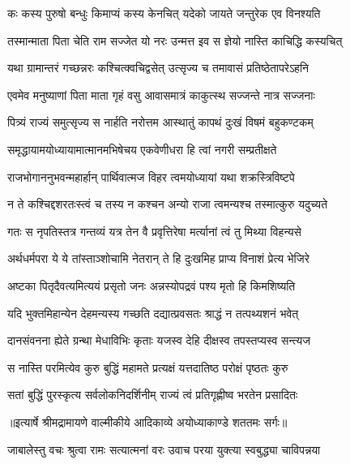 \twolineshloka
{कः कस्य पुरुषो बन्धुः किमाप्यं कस्य केनचित्}
{यदेको जायते जन्तुरेक एव विनश्यति} %

\twolineshloka
{तस्मान्माता पिता चेति राम सज्जेत यो नरः}
{उन्मत्त इव स ज्ञेयो नास्ति काचिद्धि कस्यचित्} %

\twolineshloka
{यथा ग्रामान्तरं गच्छन्नरः कश्चित्क्वचिद्वसेत्}
{उत्सृज्य च तमावासं प्रतिष्ठेतापरेऽहनि} %

\twolineshloka
{एवमेव मनुष्याणां पिता माता गृहं वसु}
{आवासमात्रं काकुत्स्थ सज्जन्ते नात्र सज्जनाः} %

\twolineshloka
{पित्र्यं राज्यं समुत्सृज्य स नार्हति नरोत्तम}
{आस्थातुं कापथं दुःखं विषमं बहुकण्टकम्} %

\twolineshloka
{समृद्धायामयोध्यायामात्मानमभिषेचय}
{एकवेणीधरा हि त्वां नगरी सम्प्रतीक्षते} %

\twolineshloka
{राजभोगाननुभवन्महार्हान् पार्थिवात्मज}
{विहर त्वमयोध्यायां यथा शक्रस्त्रिविष्टपे} %

\twolineshloka
{न ते कश्चिद्दशरतःस्त्वं च तस्य न कश्चन}
{अन्यो राजा त्वमन्यश्च तस्मात्कुरु यदुच्यते} %

\twolineshloka
{गतः स नृपतिस्तत्र गन्तव्यं यत्र तेन वै}
{प्रवृत्तिरेषा मर्त्यानां त्वं तु मिथ्या विहन्यसे} %

\twolineshloka
{अर्थधर्मपरा ये ये तांस्ताञ्शोचामि नेतरान्}
{ते हि दुःखमिह प्राप्य विनाशं प्रेत्य भेजिरे} %

\twolineshloka
{अष्टका पितृदैवत्यमित्ययं प्रसृतो जनः}
{अन्नस्योपद्रवं पश्य मृतो हि किमशिष्यति} %

\twolineshloka
{यदि भुक्तमिहान्येन देहमन्यस्य गच्छति}
{दद्यात्प्रवसतः श्राद्धं न तत्पथ्यशनं भवेत्} %

\twolineshloka
{दानसंवनना ह्येते ग्रन्था मेधाविभिः कृताः}
{यजस्व देहि दीक्षस्व तपस्तप्यस्व सन्त्यज} %

\twolineshloka
{स नास्ति परमित्येव कुरु बुद्धिं महामते}
{प्रत्यक्षं यत्तदातिष्ठ परोक्षं पृष्ठतः कुरु} %

\twolineshloka
{सतां बुद्धिं पुरस्कृत्य सर्वलोकनिदर्शिनीम्}
{राज्यं त्वं प्रतिगृह्णीष्व भरतेन प्रसादितः} %


{॥इत्यार्षे श्रीमद्रामायणे वाल्मीकीये आदिकाव्ये अयोध्याकाण्डे शततमः सर्गः॥}


\twolineshloka
{जाबालेस्तु वचः श्रुत्वा रामः सत्यात्मनां वरः}
{उवाच परया युक्त्या स्वबुद्ध्या चाविपन्नया} %

